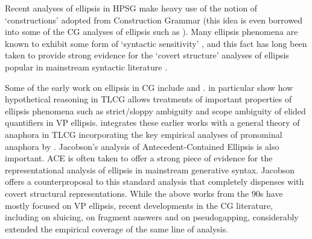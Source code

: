 \documentclass[output=paper]{langsci/langscibook}
\begin{document}
Recent analyses of ellipsis in HPSG \citep{GSag2000a-u,millereisspseudo}
make heavy use of the notion of `constructions' adopted from
Construction Grammar (this idea is even borrowed into some of the CG
analyses of ellipsis such as \citet{jacobson2016}). Many ellipsis phenomena
are known to exhibit some form of `syntactic sensitivity'
\citep{kennedy2003,chung13,yoshida-ea-pg}, and this fact has long been
taken to provide strong evidence for the `covert structure' analyses
of ellipsis popular in mainstream syntactic literature \citep{merchant13}.

Some of the early work on ellipsis in CG include \citet{hendriks-diss} and
\citet{morrillmerenciano1996}. \citet{morrillmerenciano1996} in particular show
how hypothetical reasoning in TLCG allows treatments of important
properties of ellipsis phenomena such as strict/sloppy ambiguity and
scope ambiguity of elided quantifiers in VP ellipsis. \citet{jaeger05}
integrates these earlier works with a general theory of anaphora in
TLCG incorporating the key empirical analyses of pronominal anaphora
by \citet{jacobson1999a,jacobson2000a}. Jacobson's
\citeyear{jacobson_p1998a,jacobson2008} analysis of
Antecedent-Contained Ellipsis is also important.
ACE is often taken to offer a strong piece of evidence for 
the representational analysis of
ellipsis in mainstream generative syntax.
Jacobson offers a counterproposal to this standard analysis
that completely dispenses with covert structural representations.
While the above works from the 90s
have mostly focused on VP ellipsis, recent developments in the CG
literature, including \citet{barker-sluicing} on sluicing, \citet{jacobson2016} on
fragment answers and \citet{kubota-levine-pseudo} on pseudogapping,
considerably extended the empirical coverage of the same line of
analysis.
\end{document}
